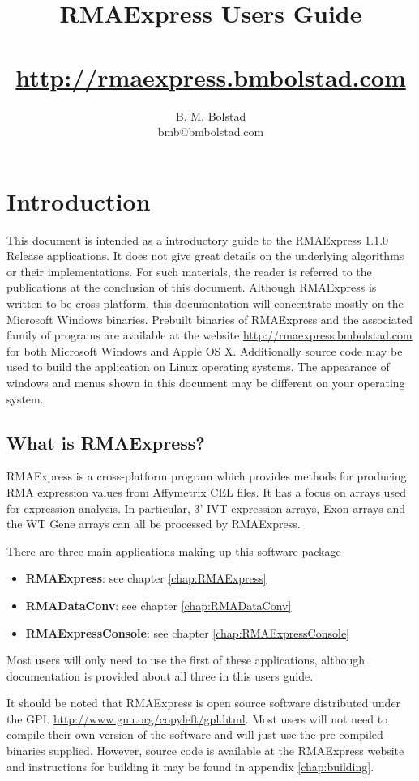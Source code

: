 \documentclass[11pt]{report}
\title{RMAExpress Users Guide \\ {\small \curversion} \\ {\small \url{http://rmaexpress.bmbolstad.com}}}
\author{B. M. Bolstad \\ bmb@bmbolstad.com}
\newcommand{\curversion}{1.1.0 Release }
\begin{document}
\maketitle

\tableofcontents

\chapter{Introduction}

This document is intended as a introductory guide to the RMAExpress \curversion applications. It does not give great details on the underlying algorithms or their implementations. For such materials, the reader is referred to the publications at the conclusion of this document. Although RMAExpress is written to be cross platform, this documentation will concentrate mostly on the Microsoft Windows binaries. Prebuilt binaries of RMAExpress and the associated family of programs are available at the website \url{http://rmaexpress.bmbolstad.com} for both Microsoft Windows and Apple OS X. Additionally source code may be used to build the application on Linux operating systems.  The appearance of windows and menus shown in this document may be different on your operating system.

\section{What is RMAExpress?}

RMAExpress is a cross-platform program which provides methods for producing RMA expression values from Affymetrix CEL files. It has a focus on arrays used for expression analysis. In particular, 3' IVT expression arrays, Exon arrays and the WT Gene arrays can all be processed by RMAExpress.

There are three main applications making up this software package
\begin{itemize}
\item {\bf RMAExpress}: see chapter \ref{chap:RMAExpress}
\item {\bf RMADataConv}: see chapter \ref{chap:RMADataConv}
\item {\bf RMAExpressConsole}: see chapter \ref{chap:RMAExpressConsole}
\end{itemize}

Most users will only need to use the first of these applications, although documentation is provided about all three in this users guide. 

It should be noted that RMAExpress is open source software distributed under the GPL  \url{http://www.gnu.org/copyleft/gpl.html}. Most users will not need to compile their own version of the software and will just use the pre-compiled binaries supplied. However, source code is available at the RMAExpress website and instructions for building it may be found in appendix \ref{chap:building}.
\end{document}
